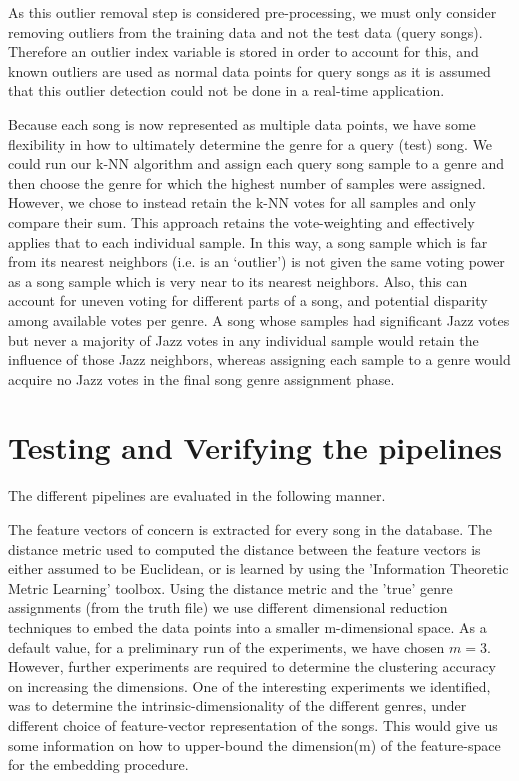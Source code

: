 \documentclass[10pt]{article}
\begin{document}
As this outlier removal step is considered pre-processing, we must only consider removing outliers from the training data and not the test data (query songs).  Therefore an outlier index variable is stored in order to account for this, and known outliers are used as normal data points for query songs as it is assumed that this outlier detection could not be done in a real-time application.

Because each song is now represented as multiple data points, we have some flexibility in how to ultimately determine the genre for a query (test) song.  We could run our k-NN algorithm and assign each query song sample to a genre and then choose the genre for which the highest number of samples were assigned.  However, we chose to instead retain the k-NN votes for all samples and only compare their sum.  This approach retains the vote-weighting and effectively applies that to each individual sample. In this way, a song sample which is far from its nearest neighbors (i.e. is an ‘outlier’) is not given the same voting power as a song sample which is very near to its nearest neighbors.  Also, this can account for uneven voting for different parts of a song, and potential disparity among available votes per genre.  A song whose samples had significant Jazz votes but never a majority of Jazz votes in any individual sample would retain the influence of those Jazz neighbors, whereas assigning each sample to a genre would acquire no Jazz votes in the final song genre assignment phase.

\section{Testing and Verifying the pipelines}

The different pipelines are evaluated in the following manner. 

The feature vectors of concern is extracted for every song in the database. The distance metric used to computed the distance between the feature vectors is either assumed to be Euclidean, or is learned by using the 'Information Theoretic Metric Learning' \cite{infoTheoryMetricLearning} toolbox. Using the distance metric and the 'true' genre assignments (from the truth file) we use different dimensional reduction techniques to embed the data points into a smaller m-dimensional space. As a default value, for a preliminary run of the experiments, we have chosen $m = 3$. However, further experiments are required to determine the clustering accuracy on increasing the dimensions. One of the interesting experiments we identified, was to determine the intrinsic-dimensionality of the different genres, under different choice of feature-vector representation of the songs. This would give us some information on how to upper-bound the dimension(m) of the feature-space for the embedding procedure.
\end{document}
